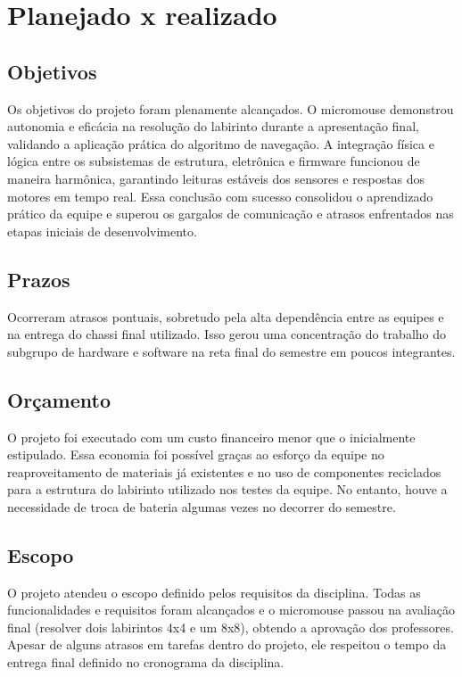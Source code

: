 \section{Planejado x realizado}
\subsection{Objetivos}
Os objetivos do projeto foram plenamente alcançados. O micromouse demonstrou autonomia e eficácia na resolução do labirinto durante a apresentação 
final, validando a aplicação prática do algoritmo de navegação. A integração física e lógica entre os subsistemas de estrutura, eletrônica e firmware
funcionou de maneira harmônica, garantindo leituras estáveis dos sensores e respostas dos motores em tempo real. Essa conclusão com sucesso consolidou
o aprendizado prático da equipe e superou os gargalos de comunicação e atrasos enfrentados nas etapas iniciais de desenvolvimento.

\subsection{Prazos}

Ocorreram atrasos pontuais, sobretudo pela alta dependência entre as equipes e na entrega do chassi final utilizado. Isso gerou uma concentração do trabalho
do subgrupo de hardware e software na reta final do semestre em poucos integrantes.

\subsection{Orçamento}

O projeto foi executado com um custo financeiro menor que o inicialmente estipulado. Essa economia foi possível graças ao esforço da equipe no reaproveitamento de materiais
já existentes e no uso de componentes reciclados para a estrutura do labirinto utilizado nos testes da equipe. No entanto, houve a necessidade de troca de bateria algumas
vezes no decorrer do semestre.

\subsection{Escopo}

O projeto atendeu o escopo definido pelos requisitos da disciplina. Todas as funcionalidades e requisitos foram alcançados e o micromouse passou na avaliação final
(resolver dois labirintos 4x4 e um 8x8), obtendo a aprovação dos professores. Apesar de alguns atrasos em tarefas dentro do projeto, ele respeitou o tempo da entrega
final definido no cronograma da disciplina.


